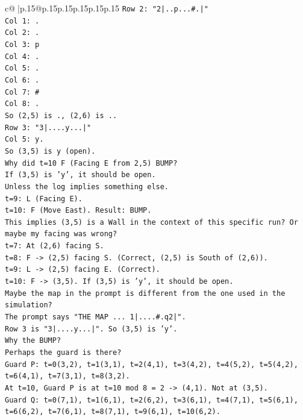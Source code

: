 \documentclass{article}
\begin{document}
{\begin{supertabular}{c@{$\;$}|p{.15\linewidth}@{}p{.15\linewidth}p{.15\linewidth}p{.15\linewidth}p{.15\linewidth}p{.15\linewidth}}
{{{\texttt{Row 2: "2|..p...\#.|"} \\
\texttt{Col 1: .} \\
\texttt{Col 2: .} \\
\texttt{Col 3: p} \\
\texttt{Col 4: .} \\
\texttt{Col 5: .} \\
\texttt{Col 6: .} \\
\texttt{Col 7: \#} \\
\texttt{Col 8: .} \\
\texttt{So (2,5) is ., (2,6) is ..} \\
\texttt{Row 3: "3|....y...|"} \\
\texttt{Col 5: y.} \\
\texttt{So (3,5) is y (open).} \\
\texttt{Why did t=10 F (Facing E from 2,5) BUMP?} \\
\texttt{If (3,5) is 'y', it should be open.} \\
\texttt{Unless the log implies something else.} \\
\texttt{t=9: L (Facing E).} \\
\texttt{t=10: F (Move East). Result: BUMP.} \\
\texttt{This implies (3,5) is a Wall in the context of this specific run? Or maybe my facing was wrong?} \\
\texttt{t=7: At (2,6) facing S.} \\
\texttt{t=8: F {-}> (2,5) facing S. (Correct, (2,5) is South of (2,6)).} \\
\texttt{t=9: L {-}> (2,5) facing E. (Correct).} \\
\texttt{t=10: F {-}> (3,5). If (3,5) is 'y', it should be open.} \\
\texttt{Maybe the map in the prompt is different from the one used in the simulation?} \\
\texttt{The prompt says "THE MAP ... 1|....\#.q2|".} \\
\texttt{Row 3 is "3|....y...|". So (3,5) is 'y'.} \\
\texttt{Why the BUMP?} \\
\texttt{Perhaps the guard is there?} \\
\texttt{Guard P: t=0(3,2), t=1(3,1), t=2(4,1), t=3(4,2), t=4(5,2), t=5(4,2), t=6(4,1), t=7(3,1), t=8(3,2).} \\
\texttt{At t=10, Guard P is at t=10 mod 8 = 2 {-}> (4,1). Not at (3,5).} \\
\texttt{Guard Q: t=0(7,1), t=1(6,1), t=2(6,2), t=3(6,1), t=4(7,1), t=5(6,1), t=6(6,2), t=7(6,1), t=8(7,1), t=9(6,1), t=10(6,2).} \\
}}}
\end{supertabular}}
\end{document}
